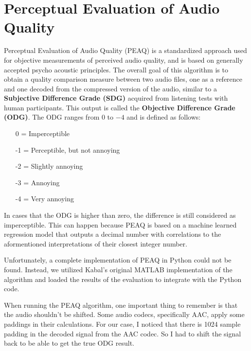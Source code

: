 \section{Perceptual Evaluation of Audio Quality}
\label{sec:peaq}

Perceptual Evaluation of Audio Quality (PEAQ) \cite{peaq} is a standardized approach used for objective measurements of perceived audio quality, and is based on generally accepted psycho acoustic principles. The overall goal of this algorithm is to obtain a quality comparison measure between two audio files, one as a reference and one decoded from the compressed version of the audio, similar to a \textbf{Subjective Difference Grade (SDG)} acquired from listening tests with human participants. This output is called the \textbf{Objective Difference Grade (ODG)}. The ODG ranges from $0$ to $-4$ and is defined as follows:

\begin{enumerate}[noitemsep]
    \item [0] = Imperceptible
    \item [-1] = Perceptible, but not annoying
    \item [-2] = Slightly annoying
    \item [-3] = Annoying
    \item [-4] = Very annoying
\end{enumerate}

In cases that the ODG is higher than zero, the difference is still considered as imperceptible. This can happen because PEAQ is based on a machine learned regression model that outputs a decimal number with correlations to the aformentioned interpretations of their closest integer number.


Unfortunately, a complete implementation of PEAQ in Python could not be found. Instead, we utilized Kabal's original MATLAB implementation of the algorithm \cite{kabal2002examination} and loaded the results of the evaluation to integrate with the Python code.

When running the PEAQ algorithm, one important thing to remember is that the audio shouldn't be shifted. Some audio codecs, specifically AAC, apply some paddings in their calculations. For our case, I noticed that there is 1024 sample padding in the decoded signal from the AAC codec. So I had to shift the signal back to be able to get the true ODG result.

